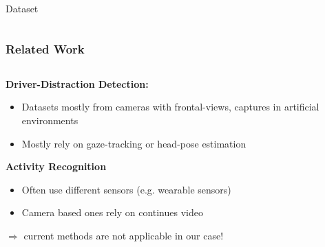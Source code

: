 \documentclass{beamer}
\begin{document}
\begin{frame}{Dataset}
\begin{columns}
\begin{column}{0.5\textwidth}
\begin{center}
            \end{center}
        \end{column}
        \end{columns}
    \end{frame}


	\begin{frame}
		\frametitle{Related Work}
		
		\begin{columns}
			\begin{column}{0.75\textwidth}
                \textbf{Driver-Distraction Detection:}
				\begin{itemize}
					\item Datasets mostly from cameras with frontal-views, captures in artificial environments  \cite{itsc:bergasa2008}
					\item Mostly rely on gaze-tracking or head-pose estimation \cite{Dorazio} \cite{6957817}
				\end{itemize}		
                \textbf{Activity Recognition}
					\begin{itemize}
						\item Often use different sensors (e.g. wearable sensors) \cite{6258525} \cite{6365160}
						\item Camera based ones rely on continues video \cite{1315249} \cite{1430826}
					\end{itemize}	
                \vspace{0.5cm}
                $\Rightarrow$ current methods are not applicable in our case!
			\end{column}
			\begin{column}{0.25\textwidth}  %
				\begin{center}

\end{center}
\end{column}
\end{columns}
\end{frame}
\end{document}

